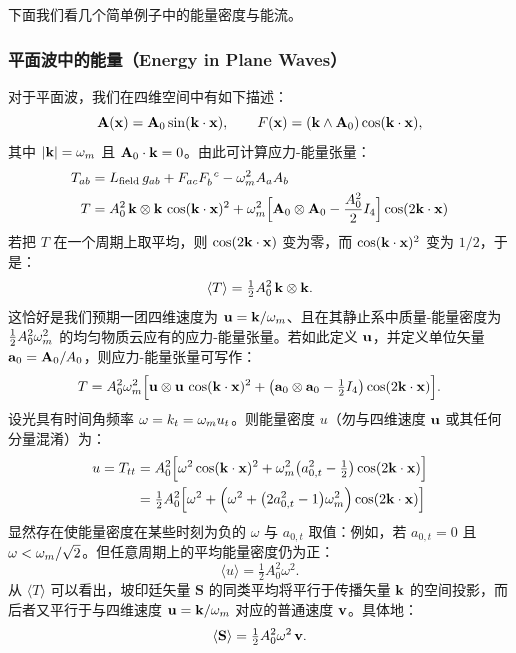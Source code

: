 下面我们看几个简单例子中的能量密度与能流。

\subsubsection{平面波中的能量（Energy in Plane Waves）}

对于平面波，我们在四维空间中有如下描述：
\[
\mathbf{A}(\mathbf{x}) = \mathbf{A}_0 \sin(\mathbf{k}\cdot\mathbf{x}), \qquad
F(\mathbf{x}) = (\mathbf{k} \wedge \mathbf{A}_0)\cos(\mathbf{k}\cdot\mathbf{x}),
\]
其中 $|\mathbf{k}| = \omega_m$ 且 $\mathbf{A}_0\cdot\mathbf{k} = 0$。由此可计算应力-能量张量：
\begin{equation}
\begin{aligned}
T_{ab} &= L_{\text{field}}\,g_{ab} + F_{ac} F_b^{\ c} - \omega_m^2 A_a A_b\\
T &= A_0^2\,\mathbf{k}\otimes\mathbf{k}\,\cos(\mathbf{k}\cdot\mathbf{x})^2 + \omega_m^2\Big[\mathbf{A}_0\otimes\mathbf{A}_0 - \frac{A_0^2}{2} I_4\Big]\cos(2\mathbf{k}\cdot\mathbf{x})
\end{aligned}
\end{equation}
若把 $T$ 在一个周期上取平均，则 $\cos(2\mathbf{k}\cdot\mathbf{x})$ 变为零，而 $\cos(\mathbf{k}\cdot\mathbf{x})^2$ 变为 $1/2$，于是：
\[
\langle T\rangle = \tfrac12 A_0^2\,\mathbf{k}\otimes\mathbf{k}.
\]
这恰好是我们预期一团四维速度为 $\mathbf{u} = \mathbf{k}/\omega_m$、且在其静止系中质量-能量密度为 $\tfrac12 A_0^2\omega_m^2$ 的均匀物质云应有的应力-能量张量。若如此定义 $\mathbf{u}$，并定义单位矢量 $\mathbf{a}_0 = \mathbf{A}_0/A_0$，则应力-能量张量可写作：
\begin{equation}
T = A_0^2 \omega_m^2\Big[\mathbf{u}\otimes\mathbf{u}\,\cos(\mathbf{k}\cdot\mathbf{x})^2 + \big(\mathbf{a}_0\otimes\mathbf{a}_0 - \tfrac12 I_4\big)\cos(2\mathbf{k}\cdot\mathbf{x})\Big].
\end{equation}
设光具有时间角频率 $\omega = k_t = \omega_m u_t$。则能量密度 $u$（勿与四维速度 $\mathbf{u}$ 或其任何分量混淆）为：
\begin{equation}
\begin{aligned}
u = T_{tt} &= A_0^2\Big[\omega^2\cos(\mathbf{k}\cdot\mathbf{x})^2 + \omega_m^2\big(a_{0,t}^2 - \tfrac12\big)\cos(2\mathbf{k}\cdot\mathbf{x})\Big]\\
&= \tfrac12 A_0^2\Big[\omega^2 + \Big(\omega^2 + \big(2a_{0,t}^2 - 1\big)\omega_m^2\Big)\cos(2\mathbf{k}\cdot\mathbf{x})\Big]
\end{aligned}
\end{equation}
显然存在使能量密度在某些时刻为负的 $\omega$ 与 $a_{0,t}$ 取值：例如，若 $a_{0,t} = 0$ 且 $\omega < \omega_m/\sqrt{2}$。但任意周期上的平均能量密度仍为正：
\[
\langle u\rangle = \tfrac12 A_0^2 \omega^2.
\]
从 $\langle T\rangle$ 可以看出，坡印廷矢量 $\mathbf{S}$ 的同类平均将平行于传播矢量 $\mathbf{k}$ 的空间投影，而后者又平行于与四维速度 $\mathbf{u} = \mathbf{k}/\omega_m$ 对应的普通速度 $\mathbf{v}$。具体地：
\[
\langle \mathbf{S}\rangle = \tfrac12 A_0^2 \omega^2\,\mathbf{v}.
\]

